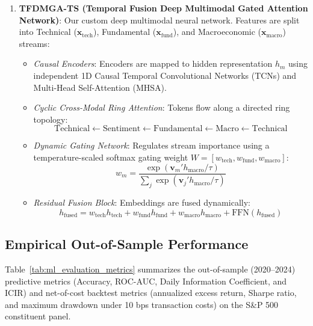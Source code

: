 \documentclass[11pt]{article}
\begin{document}
\begin{enumerate}
    \item \textbf{TFDMGA-TS (Temporal Fusion Deep Multimodal Gated Attention Network)}:
    Our custom deep multimodal neural network. Features are split into Technical ($\mathbf{x}_{\text{tech}}$), Fundamental ($\mathbf{x}_{\text{fund}}$), and Macroeconomic ($\mathbf{x}_{\text{macro}}$) streams:
    \begin{itemize}
        \item \emph{Causal Encoders}: Encoders are mapped to hidden representation $h_m$ using independent 1D Causal Temporal Convolutional Networks (TCNs) and Multi-Head Self-Attention (MHSA).
        \item \emph{Cyclic Cross-Modal Ring Attention}: Tokens flow along a directed ring topology:
        \[ \text{Technical} \leftarrow \text{Sentiment} \leftarrow \text{Fundamental} \leftarrow \text{Macro} \leftarrow \text{Technical} \]
        \item \emph{Dynamic Gating Network}: Regulates stream importance using a temperature-scaled softmax gating weight $W = [w_{\text{tech}}, w_{\text{fund}}, w_{\text{macro}}]$:
        \begin{equation}
            w_m = \frac{\exp(\mathbf{v}_m' h_{\text{macro}} / \tau)}{\sum_{j} \exp(\mathbf{v}_j' h_{\text{macro}} / \tau)}
        \end{equation}
        \item \emph{Residual Fusion Block}: Embeddings are fused dynamically:
        \begin{equation}
            h_{\text{fused}} = w_{\text{tech}} h_{\text{tech}} + w_{\text{fund}} h_{\text{fund}} + w_{\text{macro}} h_{\text{macro}} + \text{FFN}(h_{\text{fused}})
        \end{equation}
    \end{itemize}
\end{enumerate}

\subsection{Empirical Out-of-Sample Performance}
Table~\ref{tab:ml_evaluation_metrics} summarizes the out-of-sample (2020--2024) predictive metrics (Accuracy, ROC-AUC, Daily Information Coefficient, and ICIR) and net-of-cost backtest metrics (annualized excess return, Sharpe ratio, and maximum drawdown under 10 bps transaction costs) on the S\&P 500 constituent panel.
\end{document}
